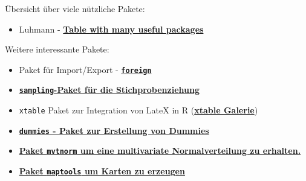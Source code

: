 \documentclass[ignorenonframetext,]{beamer}
\providecommand{\tightlist}{%
  \setlength{\itemsep}{0pt}\setlength{\parskip}{0pt}}
\begin{document}
\begin{frame}[fragile]{Übersicht über viele nützliche Pakete:}

\begin{itemize}
\tightlist
\item
  Luhmann -
  \href{http://www.beltz.de/fileadmin/beltz/downloads/OnlinematerialienPVU/28090_Luhmann/Verwendete\%20Pakete.pdf}{\textbf{Table
  with many useful packages}}
\end{itemize}

\begin{block}{Weitere interessante Pakete:}

\begin{itemize}
\item
  Paket für Import/Export -
  \href{http://cran.r-project.org/web/packages/foreign/foreign.pdf}{\textbf{\texttt{foreign}}}
\item
  \href{http://iase-web.org/documents/papers/icots8/ICOTS8_4J1_TILLE.pdf}{\textbf{\texttt{sampling}-Paket
  für die Stichprobenziehung}}
\item
  \texttt{xtable} Paket zur Integration von LateX in R
  (\href{http://cran.r-project.org/web/packages/xtable/vignettes/xtableGallery.pdf}{\textbf{xtable
  Galerie}})
\item
  \href{http://cran.r-project.org/web/packages/dummies/dummies.pdf}{\textbf{\texttt{dummies}
  - Paket zur Erstellung von Dummies}}
\item
  \href{http://cran.r-project.org/web/packages/mvtnorm/index.html}{\textbf{Paket
  \texttt{mvtnorm} um eine multivariate Normalverteilung zu erhalten. }}
\item
  \href{http://www.r-bloggers.com/tag/maptools/}{\textbf{Paket
  \texttt{maptools} um Karten zu erzeugen}}
\end{itemize}

\end{block}

\end{frame}
\end{document}
